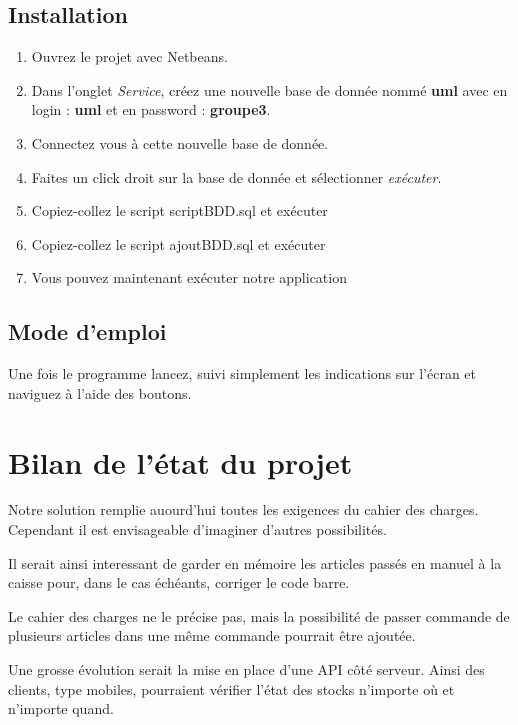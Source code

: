 \subsection{Installation}
\begin{enumerate}
	\item Ouvrez le projet avec Netbeans.
	\item Dans l'onglet \textit{Service}, créez une nouvelle base de donnée nommé \textbf{uml} avec en login : \textbf{uml} et en password : \textbf{groupe3}. 
	\item Connectez vous à cette nouvelle base de donnée.
	\item Faites un click droit sur la base de donnée et sélectionner \textit{exécuter}.
	\item Copiez-collez le script scriptBDD.sql et exécuter
	\item Copiez-collez le script ajoutBDD.sql et exécuter
	\item Vous pouvez maintenant exécuter notre application
\end{enumerate}

\subsection{Mode d'emploi}
Une fois le programme lancez, suivi simplement les indications sur l'écran et naviguez à l'aide des boutons.

\section{Bilan de l'état du projet}
Notre solution remplie auourd'hui toutes les exigences du cahier des charges. Cependant il est envisageable d'imaginer d'autres possibilités. 

Il serait ainsi interessant de garder en mémoire les articles passés en manuel à la caisse pour, dans le cas échéants, corriger le code barre.

Le cahier des charges ne le précise pas, mais la possibilité de passer commande de plusieurs articles dans une même commande pourrait être ajoutée. 

Une grosse évolution serait la mise en place d'une API côté serveur. Ainsi des clients, type mobiles, pourraient vérifier l'état des stocks n'importe où et n'importe quand. 